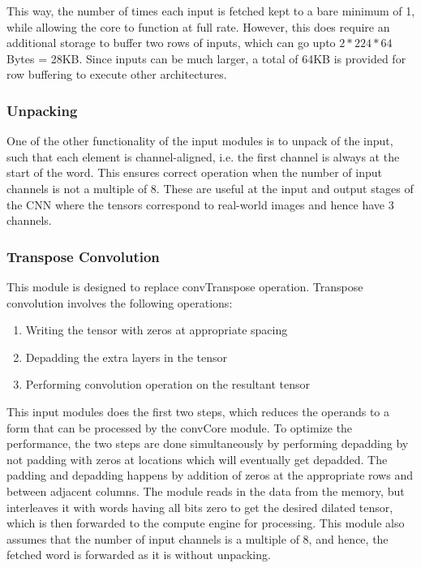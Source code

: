 \documentclass[a4paper,12pt, final]{report}
\begin{document}
This way, the number of times each input is fetched kept to a bare minimum of 1, while allowing the core to function at full rate. However, this does require an additional storage to buffer two rows of inputs, which can go upto $2*224*64$ Bytes = 28KB. Since inputs can be much larger, a total of 64KB is provided for row buffering to execute other architectures.

\subsubsection{Unpacking}

One of the other functionality of the input modules is to unpack of the input, such that each element is channel-aligned, i.e. the first channel is always at the start of the word. This ensures correct operation when the number of input channels is not a multiple of 8. These are useful at the input and output stages of the CNN where the tensors correspond to real-world images and hence have 3 channels.

\subsubsection{Transpose Convolution}

This module is designed to replace convTranspose operation. Transpose convolution involves the following operations:
\begin{enumerate}
    \item Writing the tensor with zeros at appropriate spacing
    \item Depadding the extra layers in the tensor
    \item Performing convolution operation on the resultant tensor
\end{enumerate}

This input modules does the first two steps, which reduces the operands to a form that can be processed by the convCore module. To optimize the performance, the two steps are done simultaneously by performing depadding by not padding with zeros at locations which will eventually get depadded. The padding and depadding happens by addition of zeros at the appropriate rows and between adjacent columns. The module reads in the data from the memory, but interleaves it with words having all bits zero to get the desired dilated tensor, which is then forwarded to the compute engine for processing. This module also assumes that the number of input channels is a multiple of 8, and hence, the fetched word is forwarded as it is without unpacking.
\end{document}
